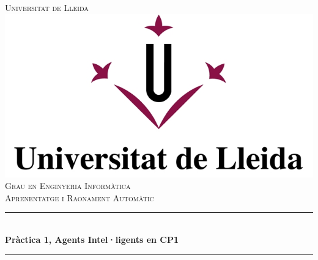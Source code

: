 \documentclass[11pt]{article}
\begin{document}
	\begin{titlepage}
		\newcommand{\HRule}{\rule{\linewidth}{0.5mm}} %
		
		\center %
		
		
		\textsc{\LARGE Universitat de Lleida}\\[1.5cm] %
		\includegraphics{Images/LogoUDL.jpg}\\[1cm] %
		\textsc{\Large Grau en Enginyeria Informàtica}\\[0.5cm] %
		\textsc{\large Aprenentatge i Raonament Automàtic}\\[0.5cm] %
		
		
		\HRule \\[0.4cm]
		{ \huge \bfseries Pràctica 1, Agents Intel·ligents en CP1}\\[0.4cm] %
		\HRule \\[1.5cm] 
		

\end{titlepage}
\end{document}
